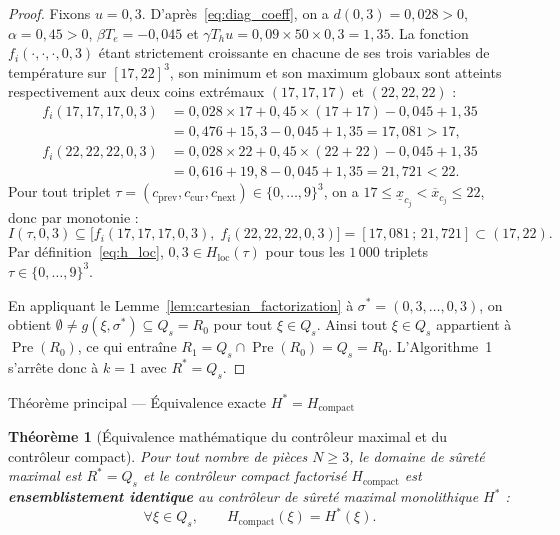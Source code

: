 \documentclass[11pt,a4paper]{article}
\theoremstyle{definition}
\theoremstyle{plain}
\newtheorem{theoreme}{Théorème}
\newcommand{\Pre}{\operatorname{Pre}}
\begin{document}
\begin{proof}
Fixons $u = 0{,}3$. D'après~\eqref{eq:diag_coeff}, on a $d(0{,}3) = 0{,}028 > 0$, $\alpha = 0{,}45 > 0$, $\beta T_e = -0{,}045$ et $\gamma T_h u = 0{,}09 \times 50 \times 0{,}3 = 1{,}35$. La fonction $f_i(\cdot, \cdot, \cdot, 0{,}3)$ étant strictement croissante en chacune de ses trois variables de température sur $[17, 22]^3$, son minimum et son maximum globaux sont atteints respectivement aux deux coins extrémaux $(17, 17, 17)$ et $(22, 22, 22)$ :
\begin{align*}
  f_i(17, 17, 17, 0{,}3)
  &= 0{,}028 \times 17 + 0{,}45 \times (17 + 17) - 0{,}045 + 1{,}35 \\
  &= 0{,}476 + 15{,}3 - 0{,}045 + 1{,}35 = 17{,}081 > 17, \\[4pt]
  f_i(22, 22, 22, 0{,}3)
  &= 0{,}028 \times 22 + 0{,}45 \times (22 + 22) - 0{,}045 + 1{,}35 \\
  &= 0{,}616 + 19{,}8 - 0{,}045 + 1{,}35 = 21{,}721 < 22.
\end{align*}
Pour tout triplet $\tau = (c_{\mathrm{prev}}, c_{\mathrm{cur}}, c_{\mathrm{next}}) \in \{0, \dots, 9\}^3$, on a $17 \le \underline{x}_{c_j} < \overline{x}_{c_j} \le 22$, donc par monotonie :
\[
  I(\tau, 0{,}3) \subseteq \bigl[f_i(17, 17, 17, 0{,}3),\; f_i(22, 22, 22, 0{,}3)\bigr] = [17{,}081\,;\, 21{,}721] \subset (17, 22).
\]
Par définition~\eqref{eq:h_loc}, $0{,}3 \in H_{\mathrm{loc}}(\tau)$ pour tous les $1\,000$ triplets $\tau \in \{0, \dots, 9\}^3$.

En appliquant le Lemme~\ref{lem:cartesian_factorization} à $\sigma^* = (0{,}3, \dots, 0{,}3)$, on obtient $\emptyset \neq g(\xi, \sigma^*) \subseteq Q_s = R_0$ pour tout $\xi \in Q_s$. Ainsi tout $\xi \in Q_s$ appartient à $\Pre(R_0)$, ce qui entraîne $R_1 = Q_s \cap \Pre(R_0) = Q_s = R_0$. L'Algorithme~1 s'arrête donc à $k = 1$ avec $R^* = Q_s$.
\end{proof}

\begin{encadre}{Théorème principal --- Équivalence exacte $H^* = H_{\mathrm{compact}}$}
\begin{theoreme}[Équivalence mathématique du contrôleur maximal et du contrôleur compact]
\label{thm:equivalence}
Pour tout nombre de pièces $N \ge 3$, le domaine de sûreté maximal est $R^* = Q_s$ et le contrôleur compact factorisé $H_{\mathrm{compact}}$ est \textbf{ensemblistement identique} au contrôleur de sûreté maximal monolithique $H^*$ :
\begin{equation}
  \forall \xi \in Q_s, \qquad H_{\mathrm{compact}}(\xi) = H^*(\xi).
  \label{eq:main_eq}
\end{equation}
\end{theoreme}
\end{encadre}
\end{document}
